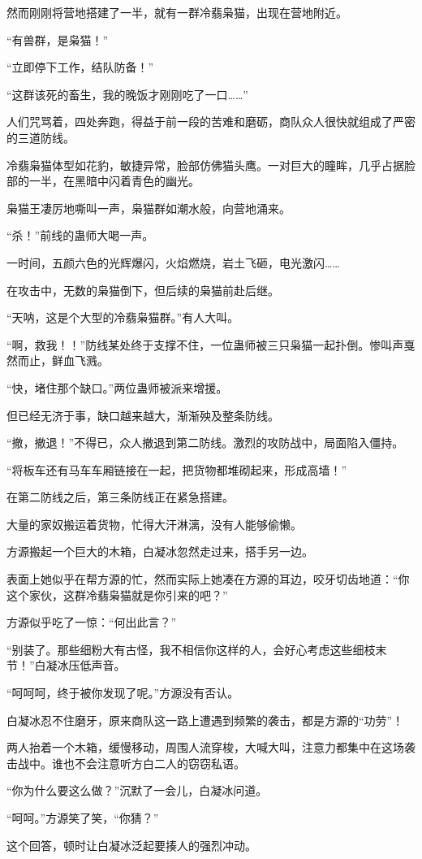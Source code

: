 \begin{this_body}
然而刚刚将营地搭建了一半，就有一群冷翡枭猫，出现在营地附近。

“有兽群，是枭猫！”

“立即停下工作，结队防备！”

“这群该死的畜生，我的晚饭才刚刚吃了一口……”

人们咒骂着，四处奔跑，得益于前一段的苦难和磨砺，商队众人很快就组成了严密的三道防线。

冷翡枭猫体型如花豹，敏捷异常，脸部仿佛猫头鹰。一对巨大的瞳眸，几乎占据脸部的一半，在黑暗中闪着青色的幽光。

枭猫王凄厉地嘶叫一声，枭猫群如潮水般，向营地涌来。

“杀！”前线的蛊师大喝一声。

一时间，五颜六色的光辉爆闪，火焰燃烧，岩土飞砸，电光激闪……

在攻击中，无数的枭猫倒下，但后续的枭猫前赴后继。

“天呐，这是个大型的冷翡枭猫群。”有人大叫。

“啊，救我！！”防线某处终于支撑不住，一位蛊师被三只枭猫一起扑倒。惨叫声戛然而止，鲜血飞溅。

“快，堵住那个缺口。”两位蛊师被派来增援。

但已经无济于事，缺口越来越大，渐渐殃及整条防线。

“撤，撤退！”不得已，众人撤退到第二防线。激烈的攻防战中，局面陷入僵持。

“将板车还有马车车厢链接在一起，把货物都堆砌起来，形成高墙！”

在第二防线之后，第三条防线正在紧急搭建。

大量的家奴搬运着货物，忙得大汗淋漓，没有人能够偷懒。

方源搬起一个巨大的木箱，白凝冰忽然走过来，搭手另一边。

表面上她似乎在帮方源的忙，然而实际上她凑在方源的耳边，咬牙切齿地道：“你这个家伙，这群冷翡枭猫就是你引来的吧？”

方源似乎吃了一惊：“何出此言？”

“别装了。那些细粉大有古怪，我不相信你这样的人，会好心考虑这些细枝末节！”白凝冰压低声音。

“呵呵呵，终于被你发现了呢。”方源没有否认。

白凝冰忍不住磨牙，原来商队这一路上遭遇到频繁的袭击，都是方源的“功劳”！

两人抬着一个木箱，缓慢移动，周围人流穿梭，大喊大叫，注意力都集中在这场袭击战中。谁也不会注意听方白二人的窃窃私语。

“你为什么要这么做？”沉默了一会儿，白凝冰问道。

“呵呵。”方源笑了笑，“你猜？”

这个回答，顿时让白凝冰泛起要揍人的强烈冲动。

\end{this_body}

